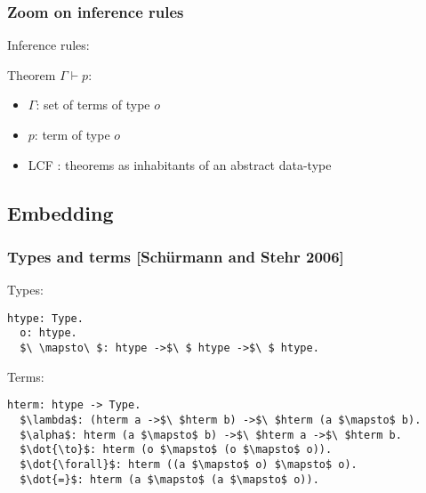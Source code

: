 \begin{frame}
\frametitle{Zoom on inference rules}

Inference rules:
\begin{mathpar}

\end{mathpar}

\vspace{0.5cm}

Theorem $\Gamma \vdash p$:
\begin{itemize}
\item $\Gamma$: set of terms of type $o$
\item $p$: term of type $o$
\end{itemize}

\vspace{0.5cm}

\begin{itemize}
\item LCF : theorems as inhabitants of an abstract data-type
\end{itemize}

\end{frame}


\subsection{Embedding}

\begin{frame}[fragile]
\frametitle{Types and terms [Schürmann and Stehr 2006]}

\begin{block}{Types:}
\begin{lstlisting}
htype: Type.
  o: htype.
  $\ \mapsto\ $: htype ->$\ $ htype ->$\ $ htype.
\end{lstlisting}
\end{block}

\begin{block}{Terms:}
\begin{lstlisting}
hterm: htype -> Type.
  $\lambda$: (hterm a ->$\ $hterm b) ->$\ $hterm (a $\mapsto$ b).
  $\alpha$: hterm (a $\mapsto$ b) ->$\ $hterm a ->$\ $hterm b.
  $\dot{\to}$: hterm (o $\mapsto$ (o $\mapsto$ o)).
  $\dot{\forall}$: hterm ((a $\mapsto$ o) $\mapsto$ o).
  $\dot{=}$: hterm (a $\mapsto$ (a $\mapsto$ o)).
\end{lstlisting}
\end{block}

\end{frame}


